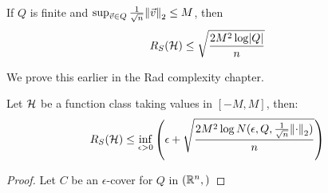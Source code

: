\begin{lemma}
    If \(Q\) is finite and \(\sup_{\vec{v} \in Q} \frac{1}{\sqrt{n}} \norm{\vec{v}}_2 \leq M\), then 
    \[
        R_S ( \mathcal{H} ) \leq \sqrt{ \frac{2M^2 \log \lvert Q \rvert}{n} }  
    \]
\end{lemma}

\begin{remark}
    We prove this earlier in the Rad complexity chapter. 
\end{remark}

\begin{theorem}
    Let \(\mathcal{H}\) be a function class taking values in \([-M, M]\), then: 
    \[
        R_S(\mathcal{H}) \leq \inf_{\epsilon > 0} \left(  \epsilon + \sqrt{ \frac{2M^2 \log N(\epsilon, 
        Q, \frac{1}{\sqrt{n}}\norm{\cdot}_2)}{n} }  \right)  
    \]
\end{theorem}


\begin{proof}
    Let \(C\) be an \(\epsilon\)-cover for \(Q\) in \((\mathbb{R}^n, )\)
\end{proof}